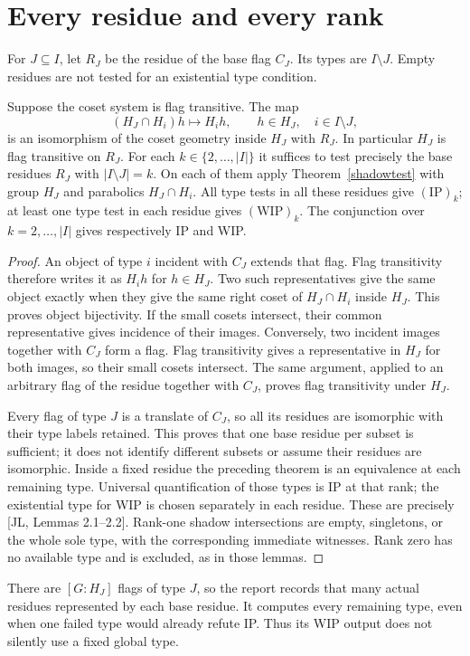 \section{Every residue and every rank}
For $J\subseteq I$, let $R_J$ be the residue of the base flag $C_J$.
Its types are $I\setminus J$. Empty residues are not tested for an
existential type condition.
\begin{theorem}\label{residue}
Suppose the coset system is flag transitive. The map
\[
 (H_J\cap H_i)h\longmapsto H_i h,\qquad h\in H_J,
 \quad i\in I\setminus J,
\]
is an isomorphism of the coset geometry inside $H_J$ with $R_J$.
In particular $H_J$ is flag transitive on $R_J$.
For each $k\in\{2,\ldots,|I|\}$ it suffices to test precisely the base
residues $R_J$ with $|I\setminus J|=k$. On each of them apply
Theorem~\ref{shadowtest} with group $H_J$ and parabolics $H_J\cap H_i$.
All type tests in all these residues give $(\mathrm{IP})_k$;
at least one type test in each residue gives $(\mathrm{WIP})_k$.
The conjunction over $k=2,\ldots,|I|$ gives respectively IP and WIP.
\end{theorem}
\begin{proof}
An object of type $i$ incident with $C_J$ extends that flag. Flag
transitivity therefore writes it as $H_i h$ for $h\in H_J$. Two such
representatives give the same object exactly when they give the same
right coset of $H_J\cap H_i$ inside $H_J$. This proves object bijectivity.
If the small cosets intersect, their common representative gives incidence
of their images. Conversely, two incident images together with $C_J$
form a flag. Flag transitivity gives a representative in $H_J$ for both
images, so their small cosets intersect. The same argument, applied to
an arbitrary flag of the residue together with $C_J$, proves flag
transitivity under $H_J$.

Every flag of type $J$ is a translate of $C_J$, so all its residues are
isomorphic with their type labels retained. This proves that one base
residue per subset is sufficient; it does not identify different subsets
or assume their residues are isomorphic. Inside a fixed residue the
preceding theorem is an equivalence at each remaining type. Universal
quantification of those types is IP at that rank; the existential type
for WIP is chosen separately in each residue. These are precisely
[JL, Lemmas 2.1--2.2]. Rank-one shadow intersections are empty, singletons,
or the whole sole type, with the corresponding immediate witnesses.
Rank zero has no available type and is excluded, as in those lemmas.
\end{proof}
There are $[G:H_J]$ flags of type $J$, so the report records that many
actual residues represented by each base residue. It computes every
remaining type, even when one failed type would already refute IP.
Thus its WIP output does not silently use a fixed global type.

